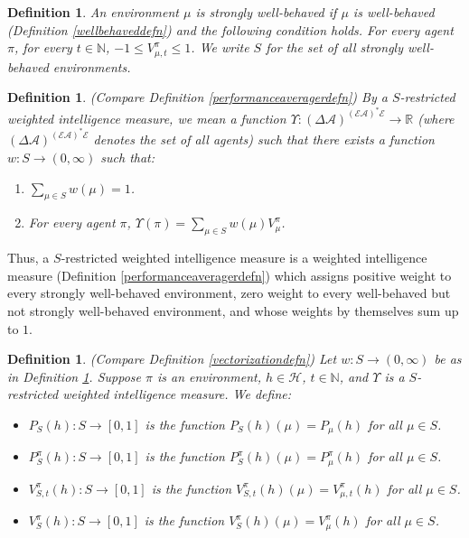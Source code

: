 \documentclass[twoside]{article}
\newtheorem{definition}[theorem]{Definition}
\begin{document}
\begin{definition}
\label{wprimedefn}
    An environment $\mu$ is \emph{strongly well-behaved} if $\mu$ is well-behaved
    (Definition \ref{wellbehaveddefn}) and the following condition holds.
    For every agent $\pi$, for every $t\in\mathbb N$,
    $-1\leq V^\pi_{\mu,t}\leq 1$. We write $S$ for the set of all
    strongly well-behaved environments.
\end{definition}

\begin{definition}
\label{swbperformanceaveragerdefn}
    (Compare Definition \ref{performanceaveragerdefn})
    By a \emph{$S$-restricted weighted intelligence measure},
    we mean a function
    $
        \Upsilon:
        (\Delta\mathcal A)^{(\mathcal E\mathcal A)^*\mathcal E}
        \to
        \mathbb R
    $
    (where
    $(\Delta\mathcal A)^{(\mathcal E\mathcal A)^*\mathcal E}$ denotes the set of all agents)
    such that there exists a function $w:S\to (0,\infty)$ such that:
    \begin{enumerate}
        \item
        $\sum_{\mu\in S}w(\mu)=1$.
        \item
        For every agent $\pi$, $\Upsilon(\pi)=\sum_{\mu\in S}w(\mu) V^\pi_\mu$.
    \end{enumerate}
\end{definition}

Thus, a $S$-restricted weighted intelligence measure is
a weighted intelligence measure (Definition \ref{performanceaveragerdefn})
which assigns positive weight to every strongly well-behaved environment,
zero weight to every well-behaved but not strongly well-behaved environment,
and whose weights by themselves sum up to $1$.

\begin{definition}
\label{infinitedimensionalvectorizationdefn}
    (Compare Definition \ref{vectorizationdefn})
    Let $w:S\to(0,\infty)$ be as in Definition \ref{swbperformanceaveragerdefn}.
    Suppose $\pi$ is an environment, $h\in\mathcal H$, $t\in\mathbb N$,
    and $\Upsilon$ is a $S$-restricted weighted intelligence measure. We define:
    \begin{itemize}
        \item
            $P_{S}(h):S\to [0,1]$ is the function
            $P_{S}(h)(\mu)=P_\mu(h)$ for all $\mu\in S$.
        \item
            $P^\pi_{S}(h):S\to [0,1]$ is the function
            $P^\pi_{S}(h)(\mu)=P^\pi_\mu(h)$ for all $\mu\in S$.
        \item
            $V^\pi_{S,t}(h):S\to [0,1]$ is the function
            $V^\pi_{S,t}(h)(\mu)=V^\pi_{\mu,t}(h)$ for all $\mu\in S$.
        \item
            $V^\pi_{S}(h):S\to [0,1]$ is the function
            $V^\pi_{S}(h)(\mu)=V^\pi_\mu(h)$ for all $\mu\in S$.
    \end{itemize}
\end{definition}
\end{document}
